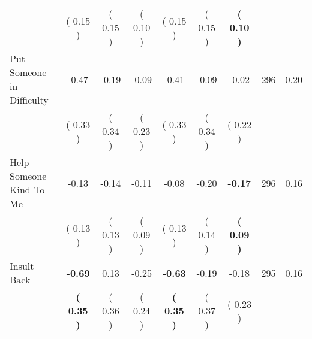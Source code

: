 \begin{tabular}{lcccccccc}
 & (     0.15 ) & (     0.15 ) & (     0.10 ) & (     0.15 ) & (     0.15 ) & \textbf{(     0.10 )} & \\
Put Someone in Difficulty &     -0.47 &     -0.19 &     -0.09 &     -0.41 &     -0.09 &     -0.02 & 296 &       0.20 \\ 
 & (     0.33 ) & (     0.34 ) & (     0.23 ) & (     0.33 ) & (     0.34 ) & (     0.22 ) & \\
Help Someone Kind To Me &     -0.13 &     -0.14 &     -0.11 &     -0.08 &     -0.20 & \textbf{    -0.17} & 296 &       0.16 \\ 
 & (     0.13 ) & (     0.13 ) & (     0.09 ) & (     0.13 ) & (     0.14 ) & \textbf{(     0.09 )} & \\
Insult Back & \textbf{    -0.69} &      0.13 &     -0.25 & \textbf{    -0.63} &     -0.19 &     -0.18 & 295 &       0.16 \\ 
 & \textbf{(     0.35 )} & (     0.36 ) & (     0.24 ) & \textbf{(     0.35 )} & (     0.37 ) & (     0.23 ) & \\
\bottomrule
\end{tabular}
